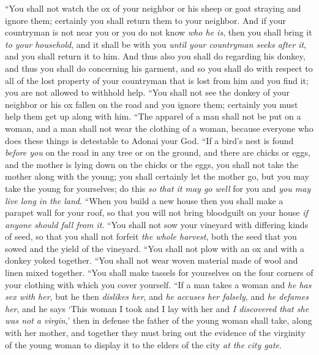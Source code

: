 \begin{biblechapter} %
\verse “You shall not watch the ox of your neighbor or his sheep or goat straying and ignore them; certainly you shall return them to your neighbor.
\verse And if your countryman is not near you or you do not know \textit{who he is}, then you shall bring it \textit{to your household}, and it shall be with you \textit{until your countryman seeks after it}, and you shall return it to him.
\verse And thus also you shall do regarding his donkey, and thus you shall do concerning his garment, and so you shall do with respect to all of the lost property of your countryman that is lost from him and you find it; you are not allowed to withhold help.
\verse “You shall not see the donkey of your neighbor or his ox fallen on the road and you ignore them; certainly you must help them get up along with him.
\verse “The apparel of a man shall not be put on a woman, and a man shall not wear the clothing of a woman, because everyone who does these things is detestable to Adonai your God.
\verse “If a bird’s nest is found \textit{before you} on the road in any tree or on the ground, and there are chicks or eggs, and the mother is lying down on the chicks or the eggs, you shall not take the mother along with the young;
\verse you shall certainly let the mother go, but you may take the young for yourselves; do this \textit{so that it may go well} for you and \textit{you may live long in the land}.
\verse “When you build a new house then you shall make a parapet wall for your roof, so that you will not bring bloodguilt on your house \textit{if anyone should fall from it}.
\verse “You shall not sow your vineyard with differing kinds of seed, so that you shall not forfeit \textit{the whole harvest}, both the seed that you sowed and the yield of the vineyard.
\verse “You shall not plow with an ox and with a donkey yoked together.
\verse “You shall not wear woven material made of wool and linen mixed together.
\verse “You shall make tassels for yourselves on the four corners of your clothing with which you cover yourself.
\verse “If a man takes a woman and \textit{he has sex with her}, but he then \textit{dislikes her},
\verse and \textit{he accuses her falsely}, and \textit{he defames her}, and he says ‘This woman I took and I lay with her and \textit{I discovered that she was not a virgin},’
\verse then in defense the father of the young woman shall take, along with her mother, and together they must bring out the evidence of the virginity of the young woman to display it to the elders of the city \textit{at the city gate}.

\end{biblechapter}
